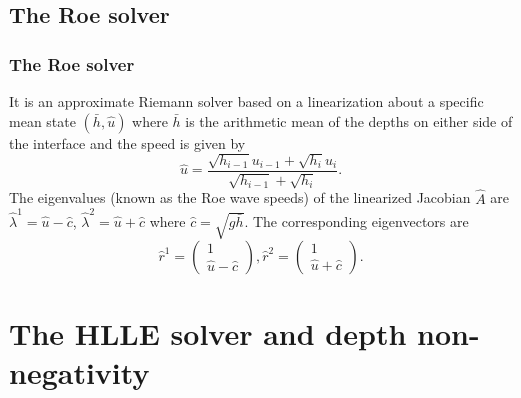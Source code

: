 \documentclass{beamer}
\begin{document}
\subsection{The Roe solver}
\frame
{
\frametitle{The Roe solver}
It is an approximate Riemann solver based on a linearization about a specific mean state $(\bar h, \hat u)$ where $\bar h$ is the arithmetic mean of the depths on either side of the interface and the speed is given by
\begin{equation}
\label{uhat}
\hat u=\frac{\sqrt{h_{i-1}} u_{i-1}+\sqrt{h_i} u_i}{\sqrt{h_{i-1}}+\sqrt{h_i}}.
\end{equation}
The eigenvalues (known as the Roe wave speeds) of the linearized Jacobian $\hat A$ are $\hat \lambda^1=\hat u-\hat c$, $\hat \lambda^2=\hat u+\hat c$ where $\hat c=\sqrt{g \bar h}$.  The corresponding eigenvectors are
\begin{equation}
\label{roeeig}
\hat r^1=\left(\begin{array}{cc}1\\ \hat u-\hat c\end{array}\right), \hat r^2=\left(\begin{array}{cc} 1\\ \hat u +\hat c\end{array}\right).
\end{equation}
}

\section{The HLLE solver and depth non-negativity}
\end{document}
